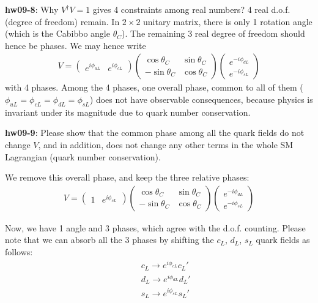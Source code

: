 \documentclass[12pt]{article}
\begin{document}
{\bf hw09-8}:  Why $V^\dagger V = 1$ gives 4 constraints among real numbers?
  4 real d.o.f. (degree of freedom) remain.  In $2\times 2$ unitary matrix,
  there is only 1 rotation angle (which is the Cabibbo angle 
$\theta_C$). The remaining 3 real degree of freedom should hence be phases.  We may hence write
\begin{eqnarray}
   V=
   \begin{pmatrix}
    e^{i \phi_{uL}} & e^{i\phi_{cL}}
   \end{pmatrix}
   \begin{pmatrix}
    \cos\theta_C & \sin\theta_C \\
    -\sin\theta_C & \cos\theta_C 
   \end{pmatrix}
   \begin{pmatrix}
    e^{-i \phi_{dL}} \\ e^{-i \phi_{sL}}
   \end{pmatrix}
\end{eqnarray}
  with 4 phases. Among the 4 phases, one overall phase, common to all
  of them ($\phi_{uL}=\phi_{cL}=\phi_{dL}=\phi_{sL}$) does not have observable
  consequences, because physics is invariant under its magnitude due
  to quark number conservation.

{\bf hw09-9}: Please show that the common phase among all the quark fields
  do not change $V$, and in addition, does not change any other terms in
  the whole SM Lagrangian (quark number conservation).

  We remove this overall phase, and keep the three relative phases:
\begin{eqnarray}
  V
  =
  \begin{pmatrix}
    1 & e^{i\phi_{cL}}
  \end{pmatrix}
  \begin{pmatrix}
    \cos\theta_C & \sin\theta_C \\
    -\sin\theta_C & \cos\theta_C 
   \end{pmatrix}
   \begin{pmatrix}
    e^{-i \phi_{dL}} \\ e^{-i \phi_{sL}}
   \end{pmatrix}
\end{eqnarray}
  
  Now, we have 1 angle and 3 phases, which agree with the d.o.f. 
counting. Please note that we can absorb all the 3 phases by shifting the $c_L$, $d_L$, $s_L$ quark fields as follows:
\begin{eqnarray}
  &&c_L \to  e^{i\phi_{cL}} c_L'\\
  &&d_L \to  e^{i\phi_{dL}} d_L'\\
  &&s_L \to  e^{i\phi_{sL}} s_L'
\end{eqnarray}
 
\end{document}
